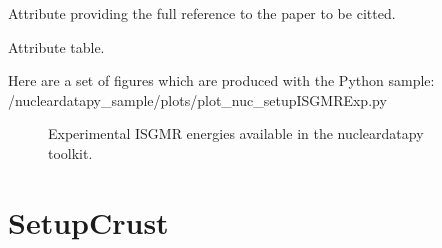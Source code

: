 \documentclass[letterpaper,10pt,english]{sphinxmanual}
\begin{document}
\begin{fulllineitems}
\begin{fulllineitems}
\end{fulllineitems}


\begin{fulllineitems}
\label{\detokenize{source/api/setup_nuc_isgmr_exp:nucleardatapy.nuc.setup_isgmr_exp.setupISGMRExp.ref}}
\pysigstartsignatures
{}
\pysigstopsignatures
\sphinxAtStartPar
Attribute providing the full reference to the paper to be citted.

\end{fulllineitems}


\begin{fulllineitems}
\label{\detokenize{source/api/setup_nuc_isgmr_exp:nucleardatapy.nuc.setup_isgmr_exp.setupISGMRExp.table}}
\pysigstartsignatures
{}
\pysigstopsignatures
\sphinxAtStartPar
Attribute table.

\end{fulllineitems}


\end{fulllineitems}


\sphinxAtStartPar
Here are a set of figures which are produced with the Python sample: /nucleardatapy\_sample/plots/plot\_nuc\_setupISGMRExp.py

\begin{figure}[htbp]
\centering
\capstart

\noindent{}
\caption{Experimental ISGMR energies available in the nucleardatapy toolkit.}\label{\detokenize{source/api/setup_nuc_isgmr_exp:id1}}\end{figure}

\sphinxstepscope


\section{SetupCrust}
\label{\detokenize{source/api/setup_crust:setupcrust}}\label{\detokenize{source/api/setup_crust::doc}}\label{\detokenize{source/api/setup_crust:module-nucleardatapy.crust.setup_crust}}
\end{document}
